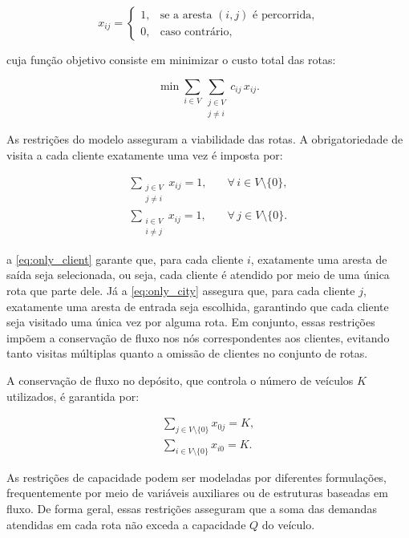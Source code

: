 \begin{equation}
    x_{ij} =
    \begin{cases}
        1, & \text{se a aresta } (i,j) \text{ é percorrida,} \\
        0, & \text{caso contrário,}
    \end{cases}
\end{equation}

\noindent cuja função objetivo consiste em minimizar o custo total das rotas:

\begin{equation}
    \min \sum_{i \in V} \sum_{\substack{j \in V \\ j \neq i}} c_{ij}\, x_{ij}.
\end{equation}

As restrições do modelo asseguram a viabilidade das rotas. A obrigatoriedade de visita a cada cliente exatamente uma vez é imposta por:

\begin{eqnarray}
\sum_{\substack{j \in V \\ j \neq i}} x_{ij} = 1, & \quad \forall\, i \in V \setminus \{0\}, \label{eq:only_client}\\[4pt]
\sum_{\substack{i \in V \\ i \neq j}} x_{ij} = 1, & \quad \forall\, j \in V \setminus \{0\}. \label{eq:only_city}
\end{eqnarray}

\noindent a \autoref{eq:only_client} garante que, para cada cliente $i$, exatamente uma aresta de saída seja selecionada, ou seja, cada cliente é atendido por meio de uma única rota que parte dele. Já a \autoref{eq:only_city} assegura que, para cada cliente $j$, exatamente uma aresta de entrada seja escolhida, garantindo que cada cliente seja visitado uma única vez por alguma rota. Em conjunto, essas restrições impõem a conservação de fluxo nos nós correspondentes aos clientes, evitando tanto visitas múltiplas quanto a omissão de clientes no conjunto de rotas. 

A conservação de fluxo no depósito, que controla o número de veículos $K$ utilizados, é garantida por:

\begin{eqnarray}
\sum_{j \in V \setminus \{0\}} x_{0j} = K, \\[4pt]
\sum_{i \in V \setminus \{0\}} x_{i0} = K.
\end{eqnarray}

As restrições de capacidade podem ser modeladas por diferentes formulações, frequentemente por meio de variáveis auxiliares ou de estruturas baseadas em fluxo. De forma geral, essas restrições asseguram que a soma das demandas atendidas em cada rota não exceda a capacidade $Q$ do veículo.

